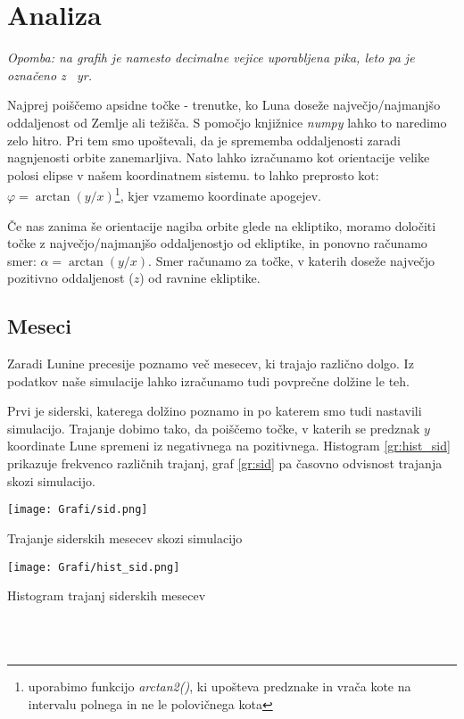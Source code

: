 \documentclass{article}
\begin{document}
\section{Analiza}

\textit{Opomba: na grafih je namesto decimalne vejice uporabljena pika, leto pa je označeno z \SI{}{yr}.}

Najprej poiščemo apsidne točke - trenutke, ko Luna doseže največjo/najmanjšo oddaljenost od Zemlje ali težišča. S pomočjo knjižnice \textit{numpy} lahko to naredimo zelo hitro. Pri tem smo upoštevali, da je sprememba oddaljenosti zaradi nagnjenosti orbite zanemarljiva. Nato lahko izračunamo kot orientacije velike polosi elipse v našem koordinatnem sistemu. to lahko preprosto kot: $\varphi=\arctan(y/x)$\footnote{uporabimo funkcijo \textit{arctan2()}, ki upošteva predznake in vrača kote na intervalu polnega in ne le polovičnega kota}, kjer vzamemo koordinate apogejev.

Če nas zanima še orientacije nagiba orbite glede na ekliptiko, moramo določiti točke z največjo/najmanjšo oddaljenostjo od ekliptike, in ponovno računamo smer: $\alpha=\arctan(y/x)$\footnotemark[2]. Smer računamo za točke, v katerih doseže največjo pozitivno oddaljenost ($z$) od ravnine ekliptike.
\subsection{Meseci}
\label{sec:meseci}
\par{} Zaradi Lunine precesije poznamo več mesecev, ki trajajo različno dolgo. Iz podatkov naše simulacije lahko izračunamo tudi povprečne dolžine le teh. 

Prvi je siderski, katerega dolžino poznamo in po katerem smo tudi nastavili simulacijo. Trajanje dobimo tako, da poiščemo točke, v katerih se predznak $y$ koordinate Lune spremeni iz negativnega na pozitivnega. Histogram \ref{gr:hist_sid} prikazuje frekvenco različnih trajanj, graf \ref{gr:sid} pa časovno odvisnost trajanja skozi simulacijo.

\begin{minipage}[t]{0.45\textwidth}
    \begin{graph}
        \centering
        \texttt{[image: Grafi/sid.png]}
        \captionsetup{width=.8\linewidth}
        \caption{Trajanje siderskih mesecev skozi simulacijo}
        \label{gr:sid}
    \end{graph}
\end{minipage}\begin{minipage}[t]{0.45\textwidth}
    \begin{graph}
        \centering
        \texttt{[image: Grafi/hist\_sid.png]}
        \captionsetup{width=.8\linewidth}
        \caption{Histogram trajanj siderskih mesecev}
        \label{gr:hist_sid}
    \end{graph}
\end{minipage}\\\\
\end{document}
